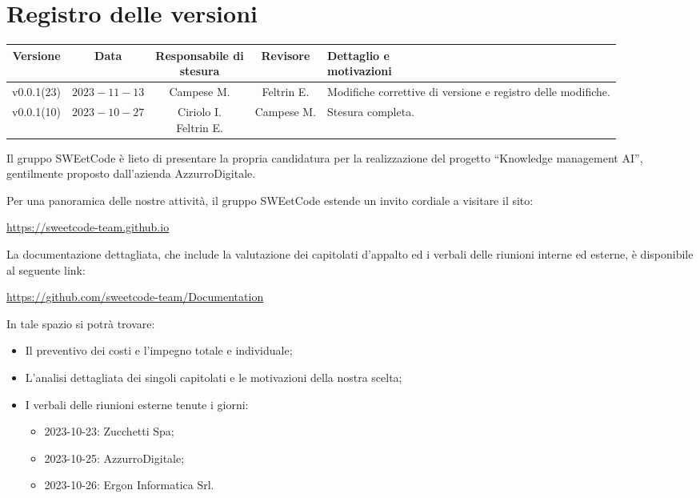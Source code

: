 \documentclass{article}
\makeatletter
\newcommand{\quantities}[1]{%
  \begin{tabular}{@{}c@{}}\strut#1\strut\end{tabular}%
}
\makeatother
\begin{document}
{\renewcommand{\arraystretch}{1.5}
\section*{Registro delle versioni}
\begin{tabularx}{\textwidth}{c|c|c|c|X}
\textbf{Versione} & \textbf{Data} & \quantities{\textbf{Responsabile di}\\\textbf{stesura}}& \textbf{Revisore} & \quantities{\textbf{Dettaglio e}\\\textbf{motivazioni}} \\
\hline
v0.0.1(23) & $2023-11-13$ & Campese M. & Feltrin E. & Modifiche correttive di versione e registro delle modifiche. \\
\hline
v0.0.1(10) & $2023-10-27$ & \quantities{Ciriolo I. \\ Feltrin E.} & Campese M. &  Stesura completa.\\

\end{tabularx}}
\newpage
Il gruppo SWEetCode è lieto di presentare la propria candidatura per la realizzazione del progetto “Knowledge management AI”, gentilmente proposto dall’azienda AzzurroDigitale.

Per una panoramica delle nostre attività, il gruppo SWEetCode estende un invito cordiale a visitare il sito:

\begin{center} 
\href{https://sweetcode-team.github.io}{https://sweetcode-team.github.io} 
\end{center}
\vspace{0.3cm}

La documentazione dettagliata, che include la valutazione dei capitolati d'appalto ed i verbali delle riunioni interne ed esterne, è disponibile al seguente link:

\begin{center}
\href{https://github.com/sweetcode-team/Documentation}{https://github.com/sweetcode-team/Documentation}
\end{center}
\vspace{0.05cm}


In tale spazio si potrà trovare:
\begin{itemize}
    \item Il preventivo dei costi e l’impegno totale e individuale;
    \end{itemize}
    \begin{itemize}
        \item L’analisi dettagliata dei singoli capitolati e le motivazioni della nostra scelta;
        \end{itemize}
        \begin{itemize}
            \item I verbali delle riunioni esterne tenute i giorni:
            \begin{itemize}
        \item 2023-10-23: Zucchetti Spa;
        \item 2023-10-25: AzzurroDigitale;
        \item 2023-10-26: Ergon Informatica Srl.
    \end{itemize}
            \end{itemize}
    
\end{document}
